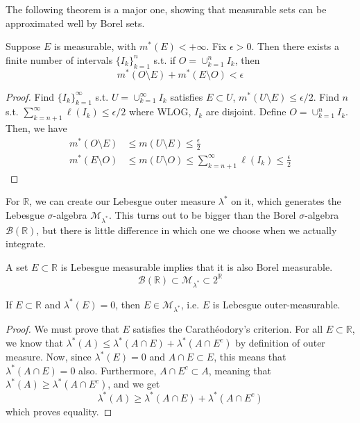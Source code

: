   The following theorem is a major one, showing that measurable sets can be approximated well by Borel sets. 

  \begin{theorem}[]
    Suppose $E$ is measurable, with $m^\ast (E) < +\infty$. Fix $\epsilon > 0$. Then there exists a finite number of intervals $\{I_k\}_{k=1}^n$ s.t. if $O = \cup_{ k=1}^n I_k$, then 
    \begin{equation}
      m^\ast (O \setminus E) + m^\ast (E \setminus O) < \epsilon
    \end{equation}
  \end{theorem}
  \begin{proof}
    Find $\{I_k\}_{k=1}^\infty$ s.t. $U = \cup_{k=1}^\infty I_k$ satisfies $E \subset U$, $m^\ast (U \setminus E) \leq \epsilon/2$. Find $n$ s.t. $\sum_{k=n+1}^\infty \ell(I_k) \leq \epsilon/2$ where WLOG, $I_k$ are disjoint. Define $O = \cup_{k=1}^n I_k$. Then, we have 
    \begin{align}
      m^\ast (O \setminus E) & \leq m(U \setminus E) \leq \frac{\epsilon}{2} \\ 
      m^\ast (E \setminus O) & \leq m(U \setminus O) \leq \sum_{k=n+1}^\infty \ell(I_k) \leq \frac{\epsilon}{2}
    \end{align}
  \end{proof}

  For $\mathbb{R}$, we can create our Lebesgue outer measure $\lambda^*$ on it, which generates the Lebesgue $\sigma$-algebra $\mathcal{M}_{\lambda^*}$. This turns out to be bigger than the Borel $\sigma$-algebra $\mathcal{B}(\mathbb{R})$, but there is little difference in which one we choose when we actually integrate. 

  \begin{theorem}
    A set $E \subset \mathbb{R}$ is Lebesgue measurable implies that it is also Borel measurable. 
    \begin{equation}
      \mathcal{B}(\mathbb{R}) \subset \mathcal{M}_{\lambda^*} \subset 2^\mathbb{R}
    \end{equation}
  \end{theorem}

  \begin{lemma}
    If $E \subset \mathbb{R}$ and $\lambda^*(E) = 0$, then $E \in \mathcal{M}_{\lambda^*}$, i.e. $E$ is Lebesgue outer-measurable. 
  \end{lemma}
  \begin{proof}
    We must prove that $E$ satisfies the Carathéodory's criterion. For all $E \subset \mathbb{R}$, we know that $\lambda^*(A) \leq \lambda^*(A \cap E) + \lambda^*(A \cap E^c)$ by definition of outer measure. Now, since $\lambda^* (E) =0$ and $A \cap E \subset E$, this means that $\lambda^* (A \cap E) = 0$ also. Furthermore, $A \cap E^c \subset A$, meaning that $\lambda^*(A) \geq \lambda^* (A \cap E^c)$, and we get 
    \begin{equation}
      \lambda^*(A) \geq \lambda^*(A \cap E) + \lambda^*(A \cap E^c)
    \end{equation}
    which proves equality. 
  \end{proof}

